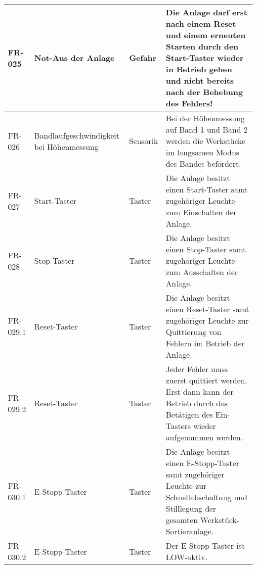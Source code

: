 \documentclass[oneside,a4paper,titlepage]{scrartcl} %
\begin{document}
\begin{small}
\begin{longtable}{|p{2cm}|p{4cm}|p{1.5cm}|p{5.5cm}|}
  \hline
  FR-025 & Not-Aus der Anlage & Gefahr & Die Anlage darf erst nach einem Reset und einem erneuten Starten durch den Start-Taster wieder in Betrieb gehen und nicht bereits nach der Behebung des Fehlers!\\
  \hline
  \rowcolor{gray} FR-026 & Bandlaufgeschwindigkeit bei Höhenmessung & Sensorik & Bei der Höhenmessung auf Band 1 und Band 2 werden die Werkstücke im langsamen Modus des Bandes befördert.\\
  \hline
  FR-027 & Start-Taster & Taster & Die Anlage besitzt einen Start-Taster samt zugehöriger Leuchte zum Einschalten der Anlage.\\
  \hline
  \rowcolor{gray} FR-028 & Stop-Taster & Taster & Die Anlage besitzt einen Stop-Taster samt zugehöriger Leuchte zum Ausschalten der Anlage.\\
  \hline
  FR-029.1 & Reset-Taster & Taster & Die Anlage besitzt einen Reset-Taster samt zugehöriger Leuchte zur Quittierung von Fehlern im Betrieb der Anlage.\\
  \hline
  FR-029.2 & Reset-Taster & Taster & Jeder Fehler muss zuerst quittiert werden. Erst dann kann der Betrieb durch das Betätigen des Ein-Tasters wieder aufgenommen werden.\\
  \hline
  \rowcolor{gray} FR-030.1 & E-Stopp-Taster & Taster & Die Anlage besitzt einen E-Stopp-Taster samt zugehöriger Leuchte zur Schnellabschaltung und Stilllegung der gesamten Werkstück-Sortieranlage.\\
  \hline
  \rowcolor{gray} FR-030.2 & E-Stopp-Taster & Taster & Der E-Stopp-Taster ist LOW-aktiv.\\
  \hline
 \end{longtable} 
\end{small}

\end{document}

